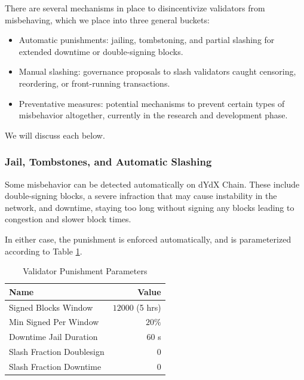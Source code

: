         There are several mechanisms in place to disincentivize validators from misbehaving, which we place into three general buckets:

        \begin{itemize}
            \item Automatic punishments: jailing, tombstoning, and partial slashing for extended downtime or double-signing blocks.
            \item Manual slashing: governance proposals to slash validators caught censoring, reordering, or front-running transactions.
            \item Preventative measures: potential mechanisms to prevent certain types of misbehavior altogether, currently in the research and development phase.
        \end{itemize}

        We will discuss each below.

        \subsubsection{Jail, Tombstones, and Automatic Slashing}

            Some misbehavior can be detected automatically on dYdX Chain. These include double-signing blocks, a severe infraction that may cause instability in the network, and downtime, staying too long without signing any blocks leading to congestion and slower block times.  

            In either case, the punishment is enforced automatically, and is parameterized according to Table \ref{tab:punishment_params}.

            \begin{table}[htp]
                \centering
                \captionsetup{justification=centering}
                \caption{Validator Punishment Parameters}
                \begin{tabular}{lr}
                    \toprule
                    Name & Value \\
                    \midrule
                    Signed Blocks Window & \( 12000 \) (5 hrs) \\
                    Min Signed Per Window & \( 20\% \) \\
                    Downtime Jail Duration & \( 60 \) s \\
                    Slash Fraction Doublesign & \( 0 \) \\
                    Slash Fraction Downtime & \( 0 \) \\
                    \bottomrule
                \end{tabular}
                \label{tab:punishment_params}
            \end{table}
            
